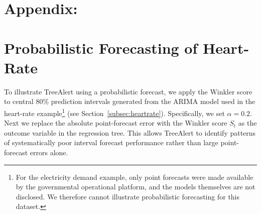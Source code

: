 \documentclass[]{interact}
\theoremstyle{plain}
\theoremstyle{definition}
\theoremstyle{remark}
\begin{document}





\FloatBarrier
{
}


\FloatBarrier

\appendix
\section*{Appendix:}

\section{Probabilistic Forecasting of Heart-Rate}
\label{probabilistic_treealert}

To illustrate TreeAlert using a probabilistic forecast, we apply the Winkler score to central 80\% prediction intervals generated from the ARIMA model used in the heart-rate example\footnote{For the electricity demand example, only point forecasts were made available by the governmental operational platform, and the models themselves are not disclosed. We therefore cannot illustrate probabilistic forecasting for this dataset.} (see Section~\ref{subsec:heartrate}). Specifically, we set $\alpha=0.2$. Next we replace the absolute point-forecast error with the Winkler score $S_t$ as the outcome variable in the regression tree. This allows TreeAlert to identify patterns of systematically poor interval forecast performance rather than large point-forecast errors alone.
\end{document}
